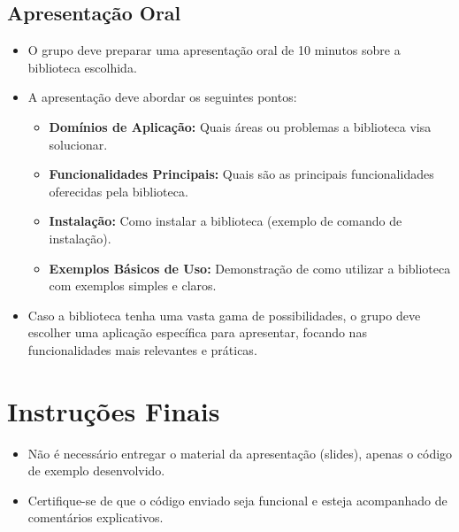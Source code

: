 \documentclass[12pt]{article}
\begin{document}
\subsection*{Apresentação Oral}
\begin{itemize}
  \item O grupo deve preparar uma apresentação oral de 10 minutos sobre a biblioteca escolhida.
  \item A apresentação deve abordar os seguintes pontos:
    \begin{itemize}
      \item \textbf{Domínios de Aplicação:} Quais áreas ou problemas a biblioteca visa solucionar.
      \item \textbf{Funcionalidades Principais:} Quais são as principais funcionalidades oferecidas pela biblioteca.
      \item \textbf{Instalação:} Como instalar a biblioteca (exemplo de comando de instalação).
      \item \textbf{Exemplos Básicos de Uso:} Demonstração de como utilizar a biblioteca com exemplos simples e claros.
    \end{itemize}
  \item Caso a biblioteca tenha uma vasta gama de possibilidades, o grupo deve escolher uma aplicação específica para apresentar, focando nas funcionalidades mais relevantes e práticas.
\end{itemize}

\section*{Instruções Finais}
\begin{itemize}
  \item Não é necessário entregar o material da apresentação (slides), apenas o código de exemplo desenvolvido.
  \item Certifique-se de que o código enviado seja funcional e esteja acompanhado de comentários explicativos.
\end{itemize}
\end{document}
